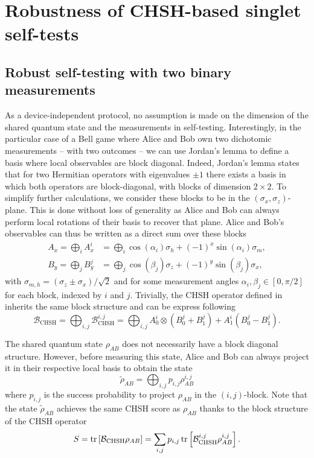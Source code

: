 \section{Robustness of CHSH-based singlet self-tests}

\subsection{Robust self-testing with two binary measurements}

As a device-independent protocol, no assumption is made on the dimension of the shared quantum state and the measurements in self-testing.
Interestingly, in the particular case of a Bell game where Alice and Bob own two dichotomic measurements -- with two outcomes -- we can use Jordan's lemma to define a basis where local observables are block diagonal.
Indeed, Jordan's lemma states that for two Hermitian operators with eigenvalues $\pm1$ there exists a basis in which both operators are block-diagonal, with blocks of dimension $2 \times 2$.
To simplify further calculations, we consider these blocks to be in the $(\sigma_x,\sigma_z)$-plane.
This is done without loss of generality as Alice and Bob can always perform local rotations of their basis to recover that plane.
Alice and Bob's observables can thus be written as a direct sum over these blocks 
\begin{equation}
	\begin{split}
	A_x = \bigoplus_i A_x^i &= \bigoplus_i \cos(\alpha_i)\sigma_h + (-1)^x \sin(\alpha_i)\sigma_m, \\
	B_y = \bigoplus_j B_y^j &= \bigoplus_j \cos(\beta_j)\sigma_z + (-1)^y \sin(\beta_j)\sigma_x,
	\end{split}
	\label{eq:block_observables}
\end{equation}
with $\sigma_{m,h} = (\sigma_z \pm \sigma_x)/\sqrt{2}$ and for some measurement angles $\alpha_i,\beta_j\in[0,\pi/2]$ for each block, indexed by $i$ and $j$.
Trivially, the CHSH operator defined in  inherits the same block structure and can be express following
\begin{equation}
	\mathcal{B}_\text{CHSH} = \bigoplus_{i,j} \mathcal{B}_\text{CHSH}^{i,j} = \bigoplus_{i,j} A_0^i \otimes (B_0^j + B_1^j) + A_1^i (B_0^j - B_1^j).
	\label{eq:block_operator}
\end{equation}

The shared quantum state $\rho_{AB}$ does not necessarily have a block diagonal structure. 
However, before measuring this state, Alice and Bob can always project it in their respective local basis to obtain the state
\begin{equation}
	\tilde{\rho}_{AB} = \bigoplus_{i,j} p_{i,j}\rho_{AB}^{i,j}
\end{equation}
where $p_{i,j}$ is the success probability to project $\rho_{AB}$ in the $(i,j)$-block.
Note that the state $\tilde{\rho}_{AB}$ achieves the same CHSH score as $\rho_{AB}$ thanks to the block structure of the CHSH operator
\begin{equation}
	S = \trr{\mathcal{B}_\text{CHSH}\rho_{AB}} = \sum_{i,j} p_{i,j} \trr{\mathcal{B}_\text{CHSH}^{i,j}\rho_{AB}^{i,j}}.
\end{equation}

